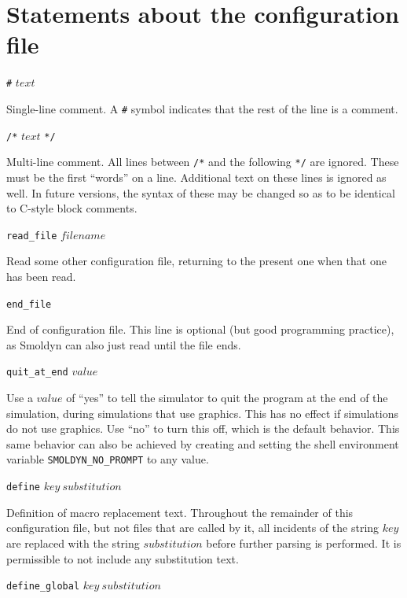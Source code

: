 \documentclass {scrbook}
\newcommand {\ttt} {\texttt}
\begin{document}
\section{Statements about the configuration file}

\begin{description}

\item{\ttt{\#} $text$}

Single-line comment. A \ttt{\#} symbol indicates that the rest of the line is a comment.

\item{\ttt{/*} $text$ \ttt{*/}}

Multi-line comment. All lines between \ttt{/*} and the following \ttt{*/} are ignored. These must be the first ``words'' on a line. Additional text on these lines is ignored as well. In future versions, the syntax of these may be changed so as to be identical to C-style block comments.

\item{\ttt{read\_file} $filename$}

Read some other configuration file, returning to the present one when that one has been read.

\item{\ttt{end\_file}}

End of configuration file. This line is optional (but good programming practice), as Smoldyn can also just read until the file ends.

\item{\ttt{quit\_at\_end} $value$}

Use a $value$ of ``yes'' to tell the simulator to quit the program at the end of the simulation, during simulations that use graphics. This has no effect if simulations do not use graphics. Use ``no'' to turn this off, which is the default behavior. This same behavior can also be achieved by creating and setting the shell environment variable \ttt{SMOLDYN\_NO\_PROMPT} to any value.

\item{\ttt{define} $key\ substitution$}

Definition of macro replacement text. Throughout the remainder of this configuration file, but not files that are called by it, all incidents of the string $key$ are replaced with the string $substitution$ before further parsing is performed. It is permissible to not include any substitution text.

\item{\ttt{define\_global} $key\ substitution$}


\end{description}
\end{document}
